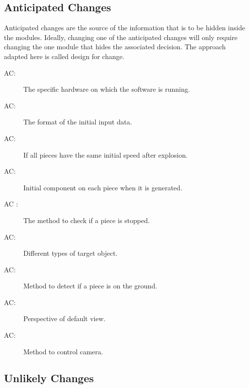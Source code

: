 \documentclass[12pt, titlepage]{article}
\newcounter{acnum}
\newcommand{\actheacnum}{AC\theacnum}
\begin{document}
	\subsection{Anticipated Changes} \label{SecAchange}
	
	Anticipated changes are the source of the information that is to be hidden
	inside the modules. Ideally, changing one of the anticipated changes will only
	require changing the one module that hides the associated decision. The approach
	adapted here is called design for
	change.
	
	\begin{description}
		\item[ \actheacnum \label{acHardware}:] The specific
		hardware on which the software is running.
		\item[ \actheacnum \label{acInput}:] The format of the
		initial input data.
		\item[ \actheacnum \label{acPO}:] If all pieces have the same initial speed after explosion.
		\item[ \actheacnum \label{acPI}:] Initial component on each piece when it is generated. 
		\item[ \actheacnum
		\label{acMove}:] The method to check if a piece is stopped. 
		\item[ \actheacnum \label{acTO}:] Different types of target object. 
		\item[ \actheacnum \label{acCD}:] Method to detect if a piece is on the ground.
		\item[ \actheacnum \label{acOP}:] Perspective of default view.
		\item[ \actheacnum \label{acCC}:] Method to control camera.
	\end{description}
	
	\subsection{Unlikely Changes} \label{SecUchange}
	
\end{document}
